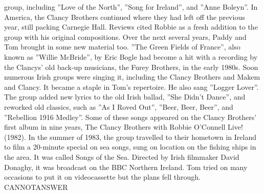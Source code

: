 \documentclass[11pt,a4paper, onecolumn]{article}
\begin{document}
group, including ''Love of the North'', ''Song for Ireland'', and ''Anne Boleyn''. In America, the Clancy Brothers continued where they had left off the previous year, still packing Carnegie Hall. Reviews cited Robbie as a fresh addition to the group with his original compositions. Over the next several years, Paddy and Tom brought in some new material too. ''The Green Fields of France'', also known as ''Willie McBride'', by Eric Bogle had become a hit with a recording by the Clancys' old back-up musicians, the Furey Brothers, in the early 1980s. Soon numerous Irish groups were singing it, including the Clancy Brothers and Makem and Clancy. It became a staple in Tom's repertoire. He also sang ''Logger Lover''. The group added new lyrics to the old Irish ballad, ''She Didn't Dance'', and reworked old classics, such as ''As I Roved Out'', ''Beer, Beer, Beer'', and ''Rebellion 1916 Medley''. Some of these songs appeared on the Clancy Brothers' first album in nine years, The Clancy Brothers with Robbie O'Connell Live! (1982). In the summer of 1983, the group travelled to their hometown in Ireland to film a 20-minute special on sea songs, sung on location on the fishing ships in the area. It was called Songs of the Sea. Directed by Irish filmmaker David Donaghy, it was broadcast on the BBC Northern Ireland. Tom tried on many occasions to put it on videocassette but the plans fell through. CANNOTANSWER
\end{document}
